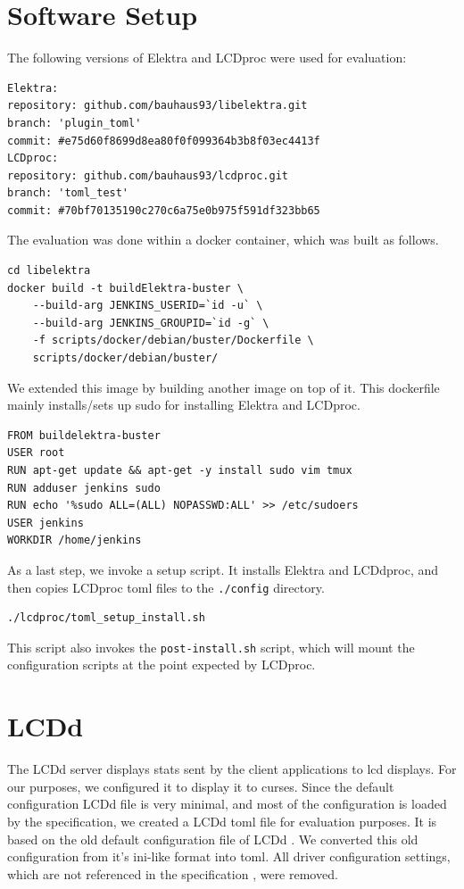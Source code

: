 \documentclass[draft,final]{vutinfth} %
\begin{document}
\section{Software Setup}

The following versions of Elektra and LCDproc were used for evaluation:
\begin{Verbatim}[frame=single]
Elektra:
repository: github.com/bauhaus93/libelektra.git
branch: 'plugin_toml'
commit: #e75d60f8699d8ea80f0f099364b3b8f03ec4413f
LCDproc:
repository: github.com/bauhaus93/lcdproc.git
branch: 'toml_test'
commit: #70bf70135190c270c6a75e0b975f591df323bb65
\end{Verbatim}


The evaluation was done within a docker container, which was built as follows.
\begin{Verbatim}[frame=single]
cd libelektra
docker build -t buildElektra-buster \
    --build-arg JENKINS_USERID=`id -u` \
    --build-arg JENKINS_GROUPID=`id -g` \
    -f scripts/docker/debian/buster/Dockerfile \
    scripts/docker/debian/buster/
\end{Verbatim}

We extended this image by building another image on top of it. This dockerfile mainly installs/sets up sudo for installing Elektra and LCDproc.
\begin{Verbatim}[frame=single]
FROM buildelektra-buster
USER root
RUN apt-get update && apt-get -y install sudo vim tmux
RUN adduser jenkins sudo
RUN echo '%sudo ALL=(ALL) NOPASSWD:ALL' >> /etc/sudoers
USER jenkins
WORKDIR /home/jenkins
\end{Verbatim}

As a last step, we invoke a setup script. It installs Elektra and LCDdproc, and then copies LCDproc \acrshort{toml} files to the \texttt{./config} directory.
\begin{Verbatim}[frame=single]
./lcdproc/toml_setup_install.sh
\end{Verbatim}
This script also invokes the \texttt{post-install.sh} script, which will mount the configuration scripts at the point expected by LCDproc.

\section{LCDd}
The LCDd server displays stats sent by the client applications to \acrshort{lcd} displays.
For our purposes, we configured it to display it to curses.
Since the default configuration LCDd file is very minimal, and most of the configuration is loaded by the specification, we created a LCDd \acrshort{toml} file for evaluation purposes.
It is based on the old default configuration file of LCDd \cite{LCDprocconf}.
We converted this old configuration from it's ini-like format into \acrshort{toml}.
All driver configuration settings, which are not referenced in the specification \cite{bauhausforklcdprocslcddspec}, were removed.
\end{document}
